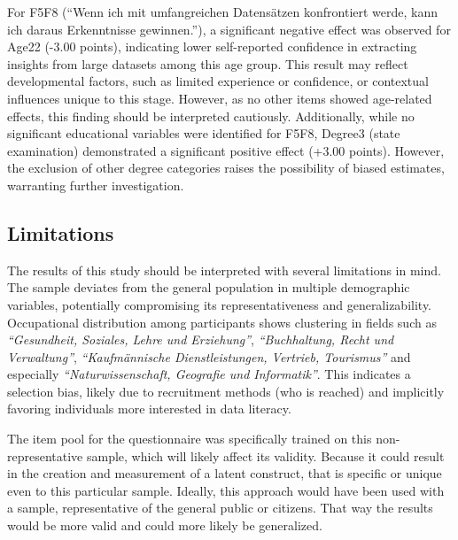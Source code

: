 \documentclass[
  12pt,
  a4paper,
  twoside]{article}
\begin{document}
For F5F8 (``Wenn ich mit umfangreichen Datensätzen konfrontiert werde, kann ich daraus Erkenntnisse gewinnen.''), a significant negative effect was observed for Age22 (-3.00 points), indicating lower self-reported confidence in extracting insights from large datasets among this age group. This result may reflect developmental factors, such as limited experience or confidence, or contextual influences unique to this stage. However, as no other items showed age-related effects, this finding should be interpreted cautiously. Additionally, while no significant educational variables were identified for F5F8, Degree3 (state examination) demonstrated a significant positive effect (+3.00 points). However, the exclusion of other degree categories raises the possibility of biased estimates, warranting further investigation.

\subsection{Limitations}\label{limitations}

The results of this study should be interpreted with several limitations in mind. The sample deviates from the general population in multiple demographic variables, potentially compromising its representativeness and generalizability. Occupational distribution among participants shows clustering in fields such as \emph{``Gesundheit, Soziales, Lehre und Erziehung''}, \emph{``Buchhaltung, Recht und Verwaltung''}, \emph{``Kaufmännische Dienstleistungen, Vertrieb, Tourismus''} and especially \emph{``Naturwissenschaft, Geografie und Informatik''}. This indicates a selection bias, likely due to recruitment methods (who is reached) and implicitly favoring individuals more interested in data literacy.

The item pool for the questionnaire was specifically trained on this non-representative sample, which will likely affect its validity. Because it could result in the creation and measurement of a latent construct, that is specific or unique even to this particular sample.
Ideally, this approach would have been used with a sample, representative of the general public or citizens. That way the results would be more valid and could more likely be generalized.
\end{document}
